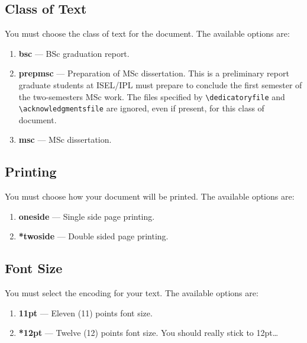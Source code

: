 \subsection{Class of Text} %
\label{sub:class_of_text}

You must choose the class of text for the document. The available options are:

\begin{enumerate}
	\item \textbf{bsc} --- BSc graduation report.
	\item \textbf{prepmsc} --- Preparation of MSc dissertation. This is a preliminary report graduate students at ISEL/IPL must prepare to conclude the first semester of the two-semesters MSc work. The files specified by \verb!\dedicatoryfile! and \verb!\acknowledgmentsfile! are ignored, even if present, for this class of document.
	\item \textbf{msc} --- MSc dissertation.
\end{enumerate}
%
\subsection{Printing} %
\label{sub:printing}

You must choose how your document will be printed. The available options are:
\begin{enumerate}
	\item \textbf{oneside} --- Single side page printing.
	\item \textbf{*twoside} --- Double sided page printing.
\end{enumerate}

\subsection{Font Size} %
\label{ssec:font_size}

You must select the encoding for your text. The available options are:
\begin{enumerate}
	\item \textbf{11pt} --- Eleven (11) points font size.
	\item \textbf{*12pt} --- Twelve (12) points font size. You should really stick to 12pt\ldots
\end{enumerate}

